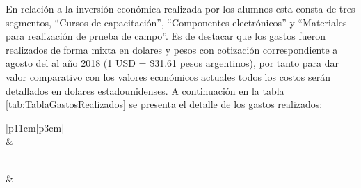 \begin{itemize}
        \par En relación a la inversión económica realizada por los alumnos esta consta de tres segmentos, ``Cursos de capacitación'', ``Componentes electrónicos'' y ``Materiales para realización de prueba de campo''. Es de destacar que los gastos fueron realizados de forma mixta en dolares y pesos con cotización correspondiente a agosto del al año 2018 (1 USD = \$31.61 pesos argentinos), por tanto para dar valor comparativo con los valores económicos actuales todos los costos serán detallados en dolares estadounidenses. A continuación en la tabla \ref{tab:TablaGastosRealizados} se presenta el detalle de los gastos realizados:
        \begin{longtable}{|p{11cm}|p{3cm}|}
                \hline
                \\
                \hline
                 &\\
                \hline
                \hline
            \endfirsthead
         
                \hline
                \\
                \hline
                 &\\
                \hline
            \endhead
         

\end{longtable}
\end{itemize}
